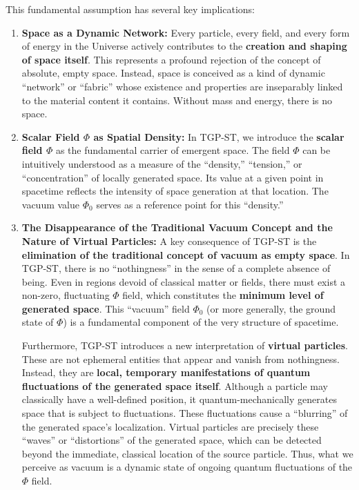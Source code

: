 \documentclass[11pt,a4paper]{article}
\begin{document}
This fundamental assumption has several key implications:

\begin{enumerate}
    \item \textbf{Space as a Dynamic Network:} Every particle, every field, and every form of energy in the Universe actively contributes to the \textbf{creation and shaping of space itself}. This represents a profound rejection of the concept of absolute, empty space. Instead, space is conceived as a kind of dynamic “network” or “fabric” whose existence and properties are inseparably linked to the material content it contains. Without mass and energy, there is no space.

    \item \textbf{Scalar Field $\Phi$ as Spatial Density:} In TGP-ST, we introduce the \textbf{scalar field $\Phi$} as the fundamental carrier of emergent space. The field $\Phi$ can be intuitively understood as a measure of the “density,” “tension,” or “concentration” of locally generated space. Its value at a given point in spacetime reflects the intensity of space generation at that location. The vacuum value $\Phi_0$ serves as a reference point for this “density.”

    \item \textbf{The Disappearance of the Traditional Vacuum Concept and the Nature of Virtual Particles:}
    A key consequence of TGP-ST is the \textbf{elimination of the traditional concept of vacuum as empty space}. In TGP-ST, there is no “nothingness” in the sense of a complete absence of being. Even in regions devoid of classical matter or fields, there must exist a non-zero, fluctuating $\Phi$ field, which constitutes the \textbf{minimum level of generated space}. This “vacuum” field $\Phi_0$ (or more generally, the ground state of $\Phi$) is a fundamental component of the very structure of spacetime.

    Furthermore, TGP-ST introduces a new interpretation of \textbf{virtual particles}. These are not ephemeral entities that appear and vanish from nothingness. Instead, they are \textbf{local, temporary manifestations of quantum fluctuations of the generated space itself}. Although a particle may classically have a well-defined position, it quantum-mechanically generates space that is subject to fluctuations. These fluctuations cause a “blurring” of the generated space’s localization. Virtual particles are precisely these “waves” or “distortions” of the generated space, which can be detected beyond the immediate, classical location of the source particle. Thus, what we perceive as vacuum is a dynamic state of ongoing quantum fluctuations of the $\Phi$ field.


\end{enumerate}
\end{document}
